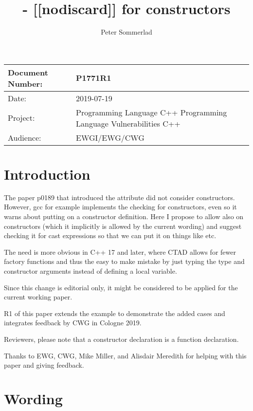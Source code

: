 \documentclass[ebook,11pt,article]{memoir}
\title{\papernumber{} - [[nodiscard]] for constructors}
\author{Peter Sommerlad}
\date{\paperdate}                %
\newcommand{\papernumber}{P1771R1}
\newcommand{\paperdate}{2019-07-19}
\begin{document}
\maketitle
\begin{center}
\begin{tabular}[t]{|l|p{8cm}|}\hline 
Document Number:&  \papernumber \\\hline
Date: & \paperdate \\\hline
Project: & Programming Language C++ \newline Programming Language Vulnerabilities C++\\\hline 
Audience: & EWGI/EWG/CWG\\\hline
\end{tabular}
\end{center}


\chapter{Introduction}

The  paper p0189 that introduced the \tcode{[[nodiscard]]} attribute did not consider constructors. However, gcc for example implements the checking for constructors, even so it warns about putting \tcode{[[nodiscard]]} on a constructor definition. Here I propose to allow  \tcode{[[nodiscard]]} also on constructors (which it implicitly is allowed by the current wording) and suggest checking it for cast expressions so that we can put it on things like  etc.

The need is more obvious in C++ 17 and later, where CTAD allows for fewer factory functions and thus the easy to make mistake by just typing the type and constructor arguments instead of defining a local variable.

Since this change is editorial only, it might be considered to be applied for the current working paper.

R1 of this paper extends the example to demonstrate the added cases and integrates feedback by CWG in Cologne 2019.

Reviewers, please note that a constructor declaration is a function declaration.

Thanks to EWG, CWG, Mike Miller, and Alisdair Meredith for helping with this paper and giving feedback.

\chapter{Wording}
\end{document}
